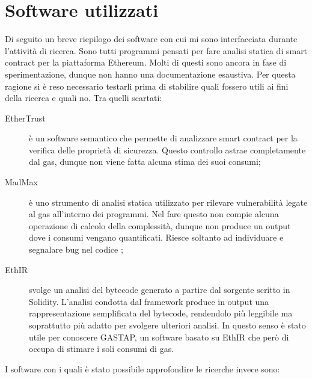\documentclass[a4paper,10pt]{article}
\begin{document}
\section{Software utilizzati}
Di seguito un breve riepilogo dei software con cui mi sono interfacciata durante l'attività di ricerca.\newline
Sono tutti programmi pensati per fare analisi statica di smart contract per la piattaforma Ethereum. Molti di questi sono ancora in fase di sperimentazione, dunque non hanno una documentazione esaustiva. Per questa ragione si è reso necessario testarli prima di stabilire quali fossero utili ai fini della ricerca e quali no.\newline
Tra quelli scartati:
\begin{description} %
  \item[EtherTrust] è un software semantico che permette di analizzare smart contract per la verifica delle proprietà di sicurezza. Questo controllo astrae completamente dal gas, dunque non viene fatta alcuna stima dei suoi consumi;
  \item[MadMax] è uno strumento di analisi statica utilizzato per rilevare vulnerabilità legate al gas all'interno dei programmi. Nel fare questo non compie alcuna operazione di calcolo della complessità, dunque non produce un output dove i consumi vengano quantificati. Riesce soltanto ad individuare e segnalare bug nel codice ;
  \item[EthIR] svolge un analisi del bytecode generato a partire dal sorgente scritto in Solidity. L'analisi condotta dal framework produce in output una rappresentazione semplificata del bytecode, rendendolo più leggibile ma soprattutto più adatto per svolgere ulteriori analisi. In questo senso è stato utile per conoscere GASTAP, un software basato su EthIR che però di occupa di stimare i soli consumi di gas.
\end{description}

I software con i quali è stato possibile approfondire le ricerche invece sono:
\end{document}

